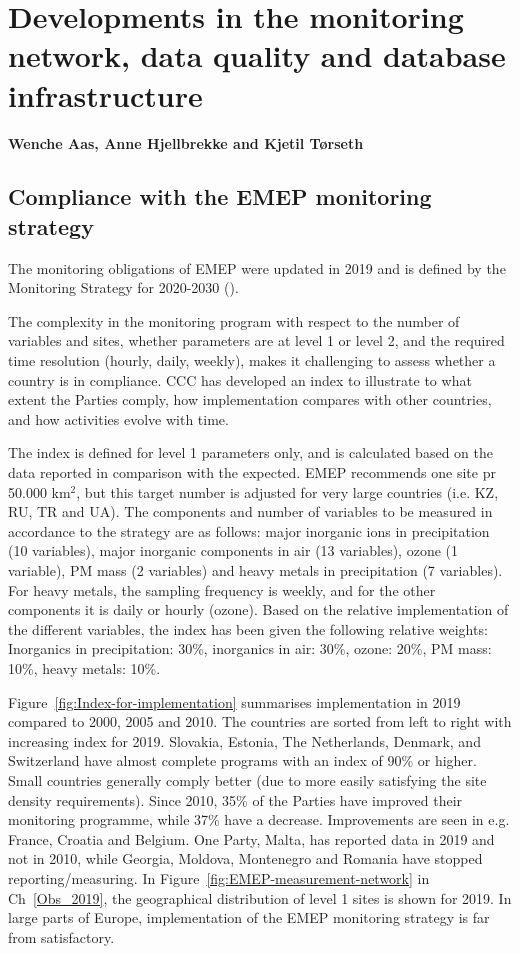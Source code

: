 \chapter[Development of measurements]{Developments in the monitoring network, data quality and database infrastructure}\label{ch:ObsDevel}

{\bf{Wenche Aas, Anne Hjellbrekke and Kjetil T{\o}rseth}}
\vspace{30pt}

\section{\label{sec:Compliance-with-monitoring}Compliance with the EMEP monitoring strategy}

The monitoring obligations of EMEP were updated in 2019 and is defined by the Monitoring Strategy for 2020-2030 (\cite{MonStrat2019}). 

The complexity in the monitoring program with respect to the number of variables and sites, whether parameters are at level 1 or level 2, and the required time resolution (hourly, daily, weekly), makes it challenging to assess whether a country is in compliance. CCC has developed an index to illustrate to what extent the Parties comply, how implementation compares with other countries, and how activities evolve with time.

The index is defined for level 1 parameters only, and is calculated based on the data reported in comparison with the expected. EMEP recommends one site pr 50.000 km$^{2}$, but this target number is adjusted for very large countries (i.e. KZ, RU, TR and UA). The components and number of variables to be measured in accordance to the strategy are as follows: major inorganic ions in precipitation (10 variables), major inorganic components in air (13 variables), ozone (1 variable), PM mass (2 variables) and heavy metals in precipitation (7 variables). For heavy metals, the sampling frequency is weekly, and for the other components it is daily or hourly (ozone). Based on the relative implementation of the different variables, the index has been given the following relative weights: Inorganics in precipitation: 30\%, inorganics in air: 30\%, ozone: 20\%, PM mass: 10\%, heavy metals: 10\%.

Figure~\ref{fig:Index-for-implementation} summarises implementation in 2019 compared to 2000, 2005 and 2010. The countries are sorted from left to right with increasing index for 2019. Slovakia,  Estonia, The Netherlands, Denmark, and Switzerland have almost complete programs with an index of 90\% or higher. Small countries generally comply better (due to more easily satisfying the site density requirements). Since 2010, 35\% of the Parties have improved their monitoring programme,  while 37\% have a decrease. Improvements are seen in e.g. France, Croatia and Belgium.  One Party, Malta, has reported data in 2019 and not in 2010, while Georgia, Moldova, Montenegro and Romania have stopped reporting/measuring. In Figure~\ref{fig:EMEP-measurement-network} in Ch~\ref{Obs_2019}, the geographical distribution of level 1 sites is shown for 2019.  In large parts of Europe, implementation of the EMEP monitoring strategy is far from satisfactory. 

